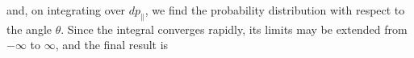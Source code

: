 and, on integrating over $dp_\parallel$, we find the probability distribution with respect to the angle $\theta$. Since the integral converges rapidly, its limits may be extended from $-\infty$ to $\infty$, and the final result is
